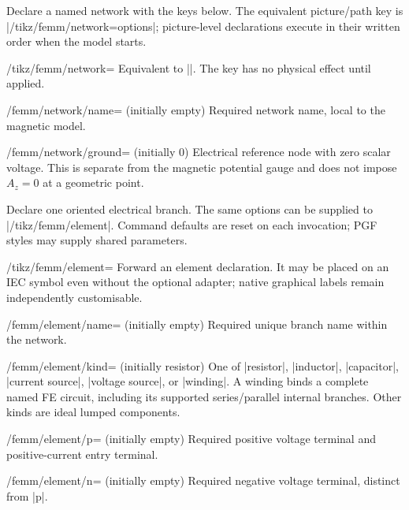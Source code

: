 \begin{command}{\femmnetwork{}}
Declare a named network with the keys below. The equivalent picture/path key is
|/tikz/femm/network={options}|; picture-level declarations execute in their
written order when the model starts.
\end{command}
\begin{key}{/tikz/femm/network=}
Equivalent to |\femmnetwork|. The key has no physical effect until applied.
\end{key}
\begin{key}{/femm/network/name= (initially empty)}
Required network name, local to the magnetic model.
\end{key}
\begin{key}{/femm/network/ground= (initially 0)}
Electrical reference node with zero scalar voltage. This is separate from the
magnetic potential gauge and does not impose $A_z=0$ at a geometric point.
\end{key}
\begin{command}{\femmelement{}}
Declare one oriented electrical branch. The same options can be supplied to
|/tikz/femm/element|. Command defaults are reset on each invocation;
PGF styles may supply shared parameters.
\end{command}
\begin{key}{/tikz/femm/element=}
Forward an element declaration. It may be placed on an IEC symbol even without
the optional adapter; native graphical labels remain independently customisable.
\end{key}
\begin{key}{/femm/element/name= (initially empty)}
Required unique branch name within the network.
\end{key}
\begin{key}{/femm/element/kind= (initially resistor)}
One of |resistor|, |inductor|, |capacitor|, |current source|, |voltage source|,
or |winding|. A winding binds a complete named FE circuit, including its supported
series/parallel internal branches. Other kinds are ideal lumped components.
\end{key}
\begin{key}{/femm/element/p= (initially empty)}
Required positive voltage terminal and positive-current entry terminal.
\end{key}
\begin{key}{/femm/element/n= (initially empty)}
Required negative voltage terminal, distinct from |p|.
\end{key}
